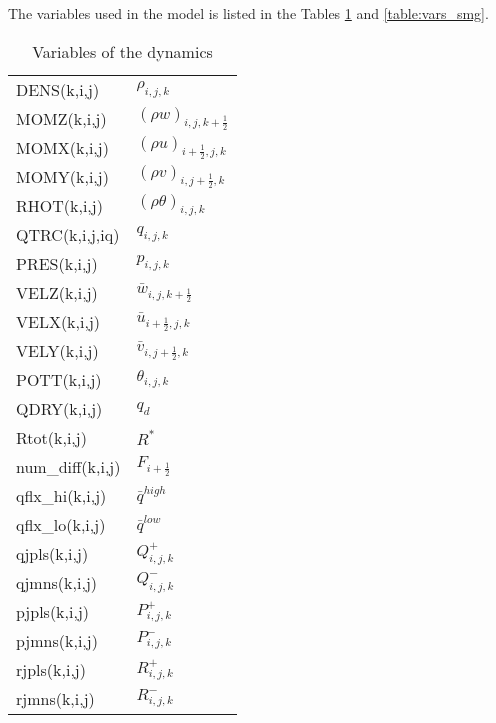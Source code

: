 The variables used in the model is listed in the Tables \ref{table:vars_dyn} and \ref{table:vars_smg}.

\begin{table}[htbp]
  \caption{Variables of the dynamics}
  \label{table:vars_dyn}
  \begin{tabular}{ll}\hline
    DENS(k,i,j) & $\rho_{i,j,k}$ \\
    MOMZ(k,i,j) & $(\rho w)_{i,j,k+\frac{1}{2}}$ \\
    MOMX(k,i,j) & $(\rho u)_{i+\frac{1}{2},j,k}$ \\
    MOMY(k,i,j) & $(\rho v)_{i,j+\frac{1}{2},k}$ \\
    RHOT(k,i,j) & $(\rho\theta)_{i,j,k}$ \\
    QTRC(k,i,j,iq) & $q_{i,j,k}$ \\
    PRES(k,i,j) & $p_{i,j,k}$ \\
    VELZ(k,i,j) & $\bar{w}_{i,j,k+\frac{1}{2}}$ \\
    VELX(k,i,j) & $\bar{u}_{i+\frac{1}{2},j,k}$ \\
    VELY(k,i,j) & $\bar{v}_{i,j+\frac{1}{2},k}$ \\
    POTT(k,i,j) & $\theta_{i,j,k}$ \\
    QDRY(k,i,j) & $q_d$ \\
    Rtot(k,i,j) & $R^*$ \\
    num\_diff(k,i,j) & $F_{i+\frac{1}{2}}$ \\
    qflx\_hi(k,i,j) & $\bar{q}^{high}$ \\
    qflx\_lo(k,i,j) & $\bar{q}^{low}$ \\
    qjpls(k,i,j) & $Q^+_{i,j,k}$ \\
    qjmns(k,i,j) & $Q^-_{i,j,k}$ \\
    pjpls(k,i,j) & $P^+_{i,j,k}$ \\
    pjmns(k,i,j) & $P^-_{i,j,k}$ \\
    rjpls(k,i,j) & $R^+_{i,j,k}$ \\
    rjmns(k,i,j) & $R^-_{i,j,k}$ \\
  \hline\end{tabular}
\end{table}


